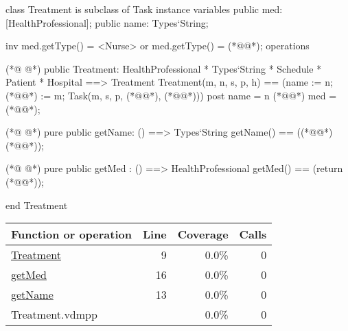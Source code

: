 \begin{vdmpp}[breaklines=true]
class Treatment is subclass of Task
instance variables
  public med: [HealthProfessional];
  public name: Types`String;
  
  inv med.getType() = <Nurse> or med.getType() = (*@@*);
operations

(*@
\label{Treatment:9}
@*)
 public Treatment: HealthProfessional * Types`String * Schedule * Patient * Hospital ==> Treatment
  Treatment(m, n, s, p, h) == (name := n; (*@@*) := m; Task(m, s, p, (*@@*), (*@@*)))
 post name = n (*@@*) med = (*@@*);
 
(*@
\label{getName:13}
@*)
 pure public getName: () ==> Types`String
  getName() == ((*@@*) (*@@*));
 
(*@
\label{getMed:16}
@*)
 pure public getMed : () ==> HealthProfessional
  getMed() == (return (*@@*));

end Treatment
\end{vdmpp}
\bigskip
\begin{longtable}{|l|r|r|r|}
\hline
Function or operation & Line & Coverage & Calls \\
\hline
\hline
\hyperref[Treatment:9]{Treatment} & 9&0.0\% & 0 \\
\hline
\hyperref[getMed:16]{getMed} & 16&0.0\% & 0 \\
\hline
\hyperref[getName:13]{getName} & 13&0.0\% & 0 \\
\hline
\hline
Treatment.vdmpp & & 0.0\% & 0 \\
\hline
\end{longtable}

